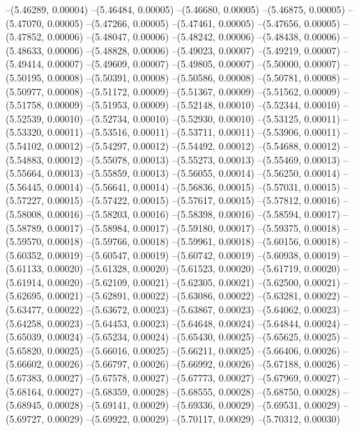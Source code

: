 --(5.46289, 0.00004)
--(5.46484, 0.00005)
--(5.46680, 0.00005)
--(5.46875, 0.00005)
--(5.47070, 0.00005)
--(5.47266, 0.00005)
--(5.47461, 0.00005)
--(5.47656, 0.00005)
--(5.47852, 0.00006)
--(5.48047, 0.00006)
--(5.48242, 0.00006)
--(5.48438, 0.00006)
--(5.48633, 0.00006)
--(5.48828, 0.00006)
--(5.49023, 0.00007)
--(5.49219, 0.00007)
--(5.49414, 0.00007)
--(5.49609, 0.00007)
--(5.49805, 0.00007)
--(5.50000, 0.00007)
--(5.50195, 0.00008)
--(5.50391, 0.00008)
--(5.50586, 0.00008)
--(5.50781, 0.00008)
--(5.50977, 0.00008)
--(5.51172, 0.00009)
--(5.51367, 0.00009)
--(5.51562, 0.00009)
--(5.51758, 0.00009)
--(5.51953, 0.00009)
--(5.52148, 0.00010)
--(5.52344, 0.00010)
--(5.52539, 0.00010)
--(5.52734, 0.00010)
--(5.52930, 0.00010)
--(5.53125, 0.00011)
--(5.53320, 0.00011)
--(5.53516, 0.00011)
--(5.53711, 0.00011)
--(5.53906, 0.00011)
--(5.54102, 0.00012)
--(5.54297, 0.00012)
--(5.54492, 0.00012)
--(5.54688, 0.00012)
--(5.54883, 0.00012)
--(5.55078, 0.00013)
--(5.55273, 0.00013)
--(5.55469, 0.00013)
--(5.55664, 0.00013)
--(5.55859, 0.00013)
--(5.56055, 0.00014)
--(5.56250, 0.00014)
--(5.56445, 0.00014)
--(5.56641, 0.00014)
--(5.56836, 0.00015)
--(5.57031, 0.00015)
--(5.57227, 0.00015)
--(5.57422, 0.00015)
--(5.57617, 0.00015)
--(5.57812, 0.00016)
--(5.58008, 0.00016)
--(5.58203, 0.00016)
--(5.58398, 0.00016)
--(5.58594, 0.00017)
--(5.58789, 0.00017)
--(5.58984, 0.00017)
--(5.59180, 0.00017)
--(5.59375, 0.00018)
--(5.59570, 0.00018)
--(5.59766, 0.00018)
--(5.59961, 0.00018)
--(5.60156, 0.00018)
--(5.60352, 0.00019)
--(5.60547, 0.00019)
--(5.60742, 0.00019)
--(5.60938, 0.00019)
--(5.61133, 0.00020)
--(5.61328, 0.00020)
--(5.61523, 0.00020)
--(5.61719, 0.00020)
--(5.61914, 0.00020)
--(5.62109, 0.00021)
--(5.62305, 0.00021)
--(5.62500, 0.00021)
--(5.62695, 0.00021)
--(5.62891, 0.00022)
--(5.63086, 0.00022)
--(5.63281, 0.00022)
--(5.63477, 0.00022)
--(5.63672, 0.00023)
--(5.63867, 0.00023)
--(5.64062, 0.00023)
--(5.64258, 0.00023)
--(5.64453, 0.00023)
--(5.64648, 0.00024)
--(5.64844, 0.00024)
--(5.65039, 0.00024)
--(5.65234, 0.00024)
--(5.65430, 0.00025)
--(5.65625, 0.00025)
--(5.65820, 0.00025)
--(5.66016, 0.00025)
--(5.66211, 0.00025)
--(5.66406, 0.00026)
--(5.66602, 0.00026)
--(5.66797, 0.00026)
--(5.66992, 0.00026)
--(5.67188, 0.00026)
--(5.67383, 0.00027)
--(5.67578, 0.00027)
--(5.67773, 0.00027)
--(5.67969, 0.00027)
--(5.68164, 0.00027)
--(5.68359, 0.00028)
--(5.68555, 0.00028)
--(5.68750, 0.00028)
--(5.68945, 0.00028)
--(5.69141, 0.00029)
--(5.69336, 0.00029)
--(5.69531, 0.00029)
--(5.69727, 0.00029)
--(5.69922, 0.00029)
--(5.70117, 0.00029)
--(5.70312, 0.00030)
